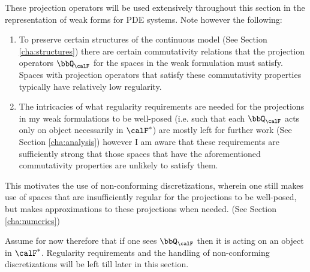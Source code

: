     \begin{remark}
        These projection operators will be used extensively throughout this section in the representation of weak forms for PDE systems. Note however the following:
        \begin{enumerate}
            \item  To preserve certain structures of the continuous model (See Section \ref{cha:structures}) there are certain commutativity relations that the projection operators $\bbQ_{\calF}$ for the spaces in the weak formulation must satisfy. Spaces with projection operators that satisfy these commutativity properties typically have relatively low regularity.
            \item  The intricacies of what regularity requirements are needed for the projections in my weak formulations to be well-posed (i.e. such that each $\bbQ_{\calF}$ acts only on object necessarily in $\calF^{*}$) are mostly left for further work (See Section \ref{cha:analysis}) however I am aware that these requirements are sufficiently strong that those spaces that have the aforementioned commutativity properties are unlikely to satisfy them.
        \end{enumerate}        
        This motivates the use of non-conforming discretizations, wherein one still makes use of spaces that are insufficiently regular for the projections to be well-posed, but makes approximations to these projections when needed. (See Section \ref{cha:numerics})
        
        Assume for now therefore that if one sees $\bbQ_{\calF}$ then it is acting on an object in $\calF^{*}$. Regularity requirements and the handling of non-conforming discretizations will be left till later in this section.
    \end{remark}